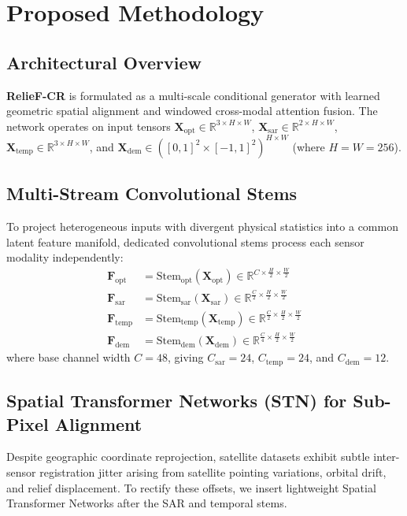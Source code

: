 \section{Proposed Methodology}
\label{sec:method}

\subsection{Architectural Overview}
\textbf{RelieF-CR} is formulated as a multi-scale conditional generator with learned geometric spatial alignment and windowed cross-modal attention fusion. The network operates on input tensors $\mathbf{X}_{\text{opt}} \in \mathbb{R}^{3 \times H \times W}$, $\mathbf{X}_{\text{sar}} \in \mathbb{R}^{2 \times H \times W}$, $\mathbf{X}_{\text{temp}} \in \mathbb{R}^{3 \times H \times W}$, and $\mathbf{X}_{\text{dem}} \in ([0, 1]^2 \times [-1, 1]^2)^{H \times W}$ (where $H=W=256$).

\subsection{Multi-Stream Convolutional Stems}
To project heterogeneous inputs with divergent physical statistics into a common latent feature manifold, dedicated convolutional stems process each sensor modality independently:
\begin{align}
    \mathbf{F}_{\text{opt}} &= \text{Stem}_{\text{opt}}(\mathbf{X}_{\text{opt}}) \in \mathbb{R}^{C \times \frac{H}{2} \times \frac{W}{2}} \\
    \mathbf{F}_{\text{sar}} &= \text{Stem}_{\text{sar}}(\mathbf{X}_{\text{sar}}) \in \mathbb{R}^{\frac{C}{2} \times \frac{H}{2} \times \frac{W}{2}} \\
    \mathbf{F}_{\text{temp}} &= \text{Stem}_{\text{temp}}(\mathbf{X}_{\text{temp}}) \in \mathbb{R}^{\frac{C}{2} \times \frac{H}{2} \times \frac{W}{2}} \\
    \mathbf{F}_{\text{dem}} &= \text{Stem}_{\text{dem}}(\mathbf{X}_{\text{dem}}) \in \mathbb{R}^{\frac{C}{4} \times \frac{H}{2} \times \frac{W}{2}}
\end{align}
where base channel width $C = 48$, giving $C_{\text{sar}} = 24$, $C_{\text{temp}} = 24$, and $C_{\text{dem}} = 12$.

\subsection{Spatial Transformer Networks (STN) for Sub-Pixel Alignment}
Despite geographic coordinate reprojection, satellite datasets exhibit subtle inter-sensor registration jitter arising from satellite pointing variations, orbital drift, and relief displacement. To rectify these offsets, we insert lightweight Spatial Transformer Networks \cite{jaderberg2015spatial} after the SAR and temporal stems.


